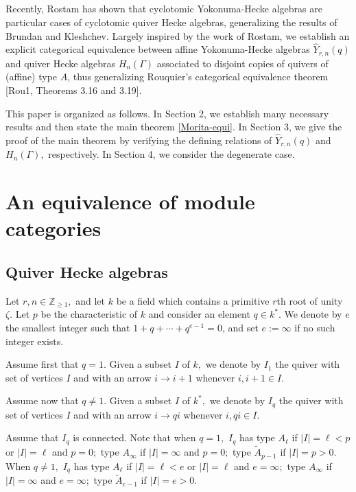 \documentclass[11pt, reqno]{amsart} \textwidth=14.9cm \oddsidemargin=1cm \evensidemargin=1cm
\theoremstyle{definition}
\numberwithin{equation}{section}
\begin{document}
\subsection{} Recently, Rostam \cite{Ro} has shown that cyclotomic Yokonuma-Hecke algebras are particular cases of cyclotomic quiver Hecke algebras, generalizing the results of Brundan and Kleshchev. Largely inspired by the work of Rostam, we establish an explicit categorical equivalence between affine Yokonuma-Hecke algebras $\widehat{Y}_{r,n}(q)$ and quiver Hecke algebras $H_{n}(\Gamma)$ associated to disjoint copies of quivers of (affine) type $A$, thus generalizing Rouquier's categorical equivalence theorem [Rou1, Theorems 3.16 and 3.19].

This paper is organized as follows. In Section 2, we establish many necessary results and then state the main theorem \ref{Morita-equi}. In Section 3, we give the proof of the main theorem by verifying the defining relations of $\widehat{Y}_{r,n}(q)$ and $H_{n}(\Gamma),$ respectively. In Section 4, we consider the degenerate case.


\section{An equivalence of module categories}

\subsection{Quiver Hecke algebras}
Let $r, n\in \mathbb{Z}_{\geq 1},$ and let $k$ be a field which contains a primitive $r$th root of unity $\zeta.$ Let $p$ be the characteristic of $k$ and consider an element $q\in k^{*}.$ We denote by $e$ the smallest integer such that $1+q+\cdots+q^{e-1}=0$, and set $e:=\infty$ if no such integer exists.

Assume first that $q=1.$ Given a subset $I$ of $k,$ we denote by $I_{1}$ the quiver with set of vertices $I$ and with an arrow $i\rightarrow i+1$ whenever $i, i+1\in I.$

Assume now that $q\neq 1.$ Given a subset $I$ of $k^{*},$ we denote by $I_{q}$ the quiver with set of vertices $I$ and with an arrow $i\rightarrow qi$ whenever $i, qi\in I.$

Assume that $I_{q}$ is connected. Note that when $q=1,$ $I_{q}$ has type $A_{\ell}$ if $\vert I\vert=\ell< p$ or $|I|=\ell$ and $p=0;$ type $A_{\infty}$ if $|I|=\infty$ and $p=0;$ type $\widetilde{A}_{p-1}$ if $|I|=p> 0.$ When $q\neq 1,$ $I_{q}$ has type $A_{\ell}$ if $\vert I\vert=\ell< e$ or $|I|=\ell$ and $e=\infty;$ type $A_{\infty}$ if $|I|=\infty$ and $e=\infty;$ type $\widetilde{A}_{e-1}$ if $|I|=e> 0.$
\end{document}
